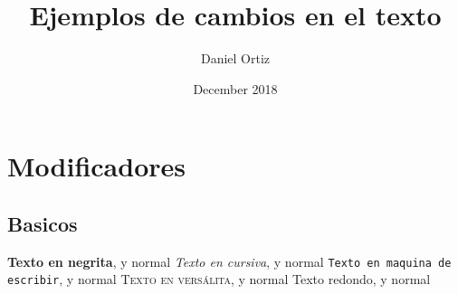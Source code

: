 \documentclass{article}
\title{Ejemplos de cambios en el texto}
\author{Daniel Ortiz}
\date{December 2018}
\begin{document}
\maketitle
\section{Modificadores}
\subsection{Basicos}
\textbf{Texto en negrita}, y normal
\newline
\newline
\textit{Texto en cursiva}, y normal
\newline
\newline
\texttt{Texto en maquina de escribir}, y normal
\newline
\newline
\textsc{Texto en versálita}, y normal
\newline
\newline
\textrm{Texto redondo}, y normal
\newline
\newline
\end{document}
